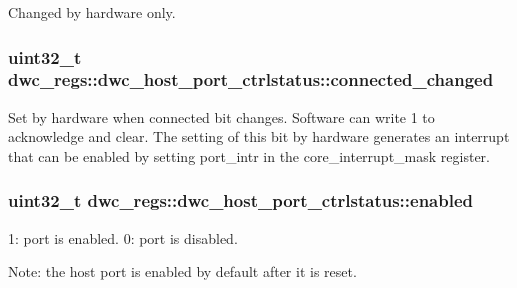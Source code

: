 Changed by hardware only. \hypertarget{uniondwc__regs_1_1dwc__host__port__ctrlstatus_aa82a0f52b9560d97ee565980d112818a}{
\subsubsection[{connected\-\_\-changed}]{\setlength{\rightskip}{0pt plus 5cm}uint32\-\_\-t dwc\-\_\-regs\-::dwc\-\_\-host\-\_\-port\-\_\-ctrlstatus\-::connected\-\_\-changed}}\label{uniondwc__regs_1_1dwc__host__port__ctrlstatus_aa82a0f52b9560d97ee565980d112818a}
Set by hardware when connected bit changes. Software can write 1 to acknowledge and clear. The setting of this bit by hardware generates an interrupt that can be enabled by setting port\-\_\-intr in the core\-\_\-interrupt\-\_\-mask register. \hypertarget{uniondwc__regs_1_1dwc__host__port__ctrlstatus_a138dd5347ad90387c1ad0aeea43f8c06}{
\subsubsection[{enabled}]{\setlength{\rightskip}{0pt plus 5cm}uint32\-\_\-t dwc\-\_\-regs\-::dwc\-\_\-host\-\_\-port\-\_\-ctrlstatus\-::enabled}}\label{uniondwc__regs_1_1dwc__host__port__ctrlstatus_a138dd5347ad90387c1ad0aeea43f8c06}
1\-: port is enabled. 0\-: port is disabled.

Note\-: the host port is enabled by default after it is reset.

